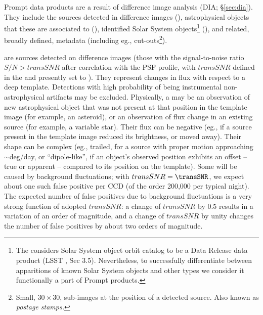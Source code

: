 \documentclass[SE,lsstdraft,toc]{lsstdoc}
\begin{document}
Prompt data products are a result of difference image analysis (DIA; \S \ref{sec:dia}). They include the sources detected in difference images (\DIASources), astrophysical objects that these are associated to (\DIAObjects), identified Solar System objects\footnote{The \SRD considers Solar System object orbit catalog to be a Data Release data product (LSST \SRD, Sec 3.5). Nevertheless, to successfully differentiate between apparitions of known Solar System objects and other types \DIASources we consider it functionally a part of Prompt products.} (\SSObject), and related, broadly defined, metadata (including eg., cut-outs\footnote{Small, $30 \times 30$, sub-images at the position of a detected source. Also known as \emph{postage stamps.}}).

\DIASources are sources detected on difference images (those with the signal-to-noise ratio $S/N>transSNR$ after correlation with the PSF profile, with $transSNR$ defined in the \SRD and presently set to \transSNR). They represent changes in flux with respect to a deep template. Detections with high probability of being instrumental non-astrophysical artifacts may be excluded. Physically, a \DIASource may be an observation of new astrophysical object that was not present at that position in the template image (for example, an asteroid), or an observation of flux change in an existing source (for example, a variable star). Their flux can be negative (eg., if a source present in the template image reduced its brightness, or moved away). Their shape can be complex (eg., trailed, for a source with proper motion approaching $\sim$deg/day, or ``dipole-like'', if an object's observed position exhibits an offset -- true or apparent -- compared to its position on the template).
Some \DIASources will be caused by background fluctuations; with $transSNR = \transSNR$,
we expect about one such false positive per CCD (of the order 200,000 per typical night). The expected number of false
positives due to background fluctuations is a very strong function of adopted $transSNR$: a change of $transSNR$ by 0.5
results in a variation of an order of magnitude, and a change of $transSNR$ by unity changes the number of false
positives by about two orders of magnitude.
\end{document}
